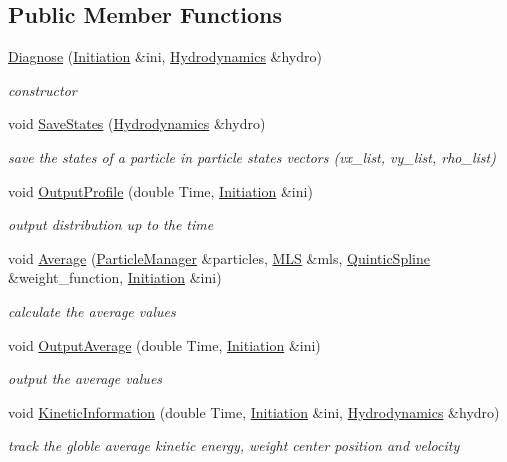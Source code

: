 \subsection*{Public Member Functions}
\begin{CompactItemize}
\item 
\hyperlink{classDiagnose_915a3d571504c843748bf5e9a9ec801c}{Diagnose} (\hyperlink{classInitiation}{Initiation} \&ini, \hyperlink{classHydrodynamics}{Hydrodynamics} \&hydro)
\begin{CompactList}\small\item\em constructor \item\end{CompactList}\item 
void \hyperlink{classDiagnose_bf6d65f3716a9d637186f97c62f7218b}{SaveStates} (\hyperlink{classHydrodynamics}{Hydrodynamics} \&hydro)
\begin{CompactList}\small\item\em save the states of a particle in particle states vectors (vx\_\-list, vy\_\-list, rho\_\-list) \item\end{CompactList}\item 
void \hyperlink{classDiagnose_db2f9991031fb8c301f44518c1d851ea}{OutputProfile} (double Time, \hyperlink{classInitiation}{Initiation} \&ini)
\begin{CompactList}\small\item\em output distribution up to the time \item\end{CompactList}\item 
void \hyperlink{classDiagnose_8c14b3fa58083f64be2018bd0462604d}{Average} (\hyperlink{classParticleManager}{ParticleManager} \&particles, \hyperlink{classMLS}{MLS} \&mls, \hyperlink{classQuinticSpline}{QuinticSpline} \&weight\_\-function, \hyperlink{classInitiation}{Initiation} \&ini)
\begin{CompactList}\small\item\em calculate the average values \item\end{CompactList}\item 
void \hyperlink{classDiagnose_dc46dd26362f94e09b956b3affa247c9}{OutputAverage} (double Time, \hyperlink{classInitiation}{Initiation} \&ini)
\begin{CompactList}\small\item\em output the average values \item\end{CompactList}\item 
void \hyperlink{classDiagnose_9c73b32dc8facce488617780250c14bf}{KineticInformation} (double Time, \hyperlink{classInitiation}{Initiation} \&ini, \hyperlink{classHydrodynamics}{Hydrodynamics} \&hydro)
\begin{CompactList}\small\item\em track the globle average kinetic energy, weight center position and velocity \item\end{CompactList}\end{CompactItemize}
